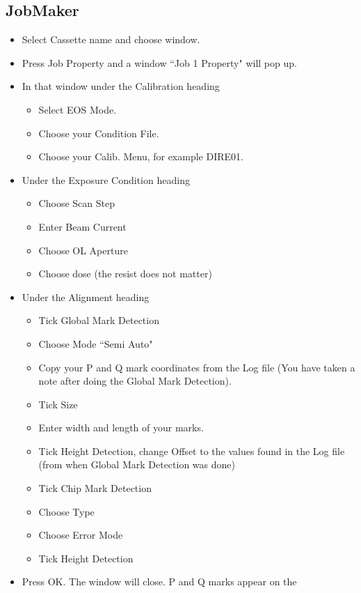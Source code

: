 \subsection{JobMaker}
\label{sec:jobmaker-1}
\begin{itemize}
\item Select Cassette name and choose window. %
\item Press Job Property and a window ``Job 1 Property" will pop up.

\item In that window under the Calibration heading
  \begin{itemize}
  \item Select EOS Mode.
  \item Choose your Condition File.
  \item Choose your Calib. Menu, for example DIRE01. %
  \end{itemize}
\item Under the Exposure Condition heading
  \begin{itemize}
  \item Choose Scan Step
  \item Enter Beam Current
  \item Choose OL Aperture
  \item Choose dose (the resist does not matter)
  \end{itemize}
\item Under the Alignment heading
  \begin{itemize}
  \item Tick Global Mark Detection
  \item Choose Mode ``Semi Auto"
  \item Copy  your P and  Q mark coordinates  from the Log  file (You
    have taken a note after doing the Global Mark Detection).
  \item Tick Size
  \item Enter width and length of your marks.
  \item Tick Height  Detection, change Offset to the  values found in
    the Log file (from when Global Mark Detection was done)
  \item Tick Chip Mark Detection
  \item Choose Type
  \item Choose Error Mode
  \item Tick Height Detection
  \end{itemize}
\item Press OK. The  window will close.  P and Q  marks appear on the

\end{itemize}
